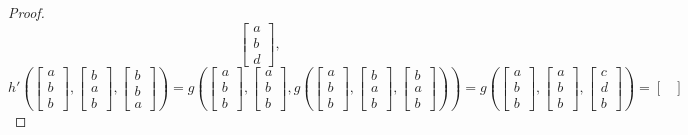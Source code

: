 \documentclass[10pt,a4paper]{amsart}
\begin{document}
\begin{proof}
\begin{equation*}
\begin{bmatrix}
a \\
b\\
d
\end{bmatrix},
\end{equation*}
\begin{equation*}
h'\left(
\begin{bmatrix}
a \\
b \\
b
\end{bmatrix}\!,\!
\begin{bmatrix}
b \\
a \\
b
\end{bmatrix}\!,\!
\begin{bmatrix}
b \\
b \\
a
\end{bmatrix}
\right)=
g\left(
\begin{bmatrix}
a \\
b \\
b
\end{bmatrix}\!,\!
\begin{bmatrix}
a \\
b \\
b
\end{bmatrix}\!,\!
g\left(
\begin{bmatrix}
a \\
b \\
b
\end{bmatrix}\!,\!
\begin{bmatrix}
b \\
a \\
b
\end{bmatrix}\!,\!
\begin{bmatrix}
b \\
a \\
b
\end{bmatrix}
\right)
\right)=
g\left(
\begin{bmatrix}
a \\
b \\
b
\end{bmatrix}\!,\!
\begin{bmatrix}
a \\
b \\
b
\end{bmatrix}\!,\!
\begin{bmatrix}
c \\
d \\
b
\end{bmatrix}
\right)=
\begin{bmatrix}

\end{bmatrix}
\end{equation*}
\end{proof}
\end{document}

